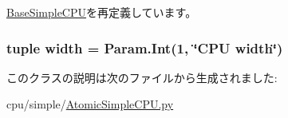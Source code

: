 \hyperlink{classBaseSimpleCPU_1_1BaseSimpleCPU_acce15679d830831b0bbe8ebc2a60b2ca}{BaseSimpleCPU}を再定義しています。\hypertarget{classAtomicSimpleCPU_1_1AtomicSimpleCPU_a397bb3beea7b21f074bc75e1e71f132f}{
\subsubsection[{width}]{\setlength{\rightskip}{0pt plus 5cm}tuple {\bf width} = Param.Int(1, \char`\"{}CPU {\bf width}\char`\"{})}}
\label{classAtomicSimpleCPU_1_1AtomicSimpleCPU_a397bb3beea7b21f074bc75e1e71f132f}


このクラスの説明は次のファイルから生成されました:\begin{DoxyCompactItemize}
\item 
cpu/simple/\hyperlink{AtomicSimpleCPU_8py}{AtomicSimpleCPU.py}\end{DoxyCompactItemize}
